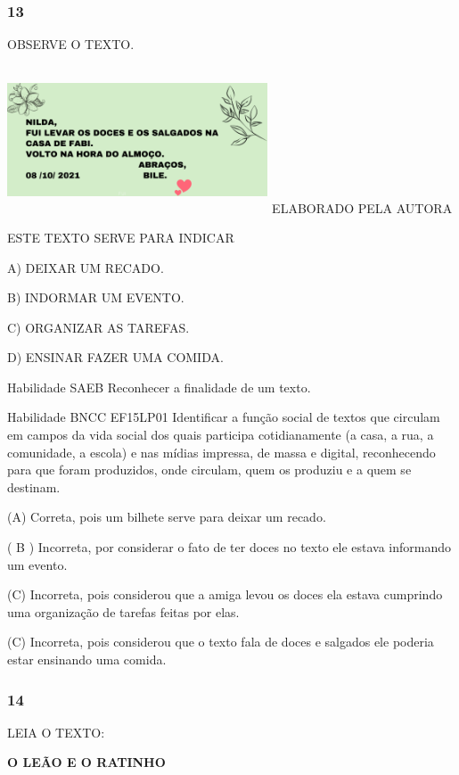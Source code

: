 \begin{escola}
\subsubsection{13 }\label{section-53}

OBSERVE O TEXTO.

\includegraphics[width=3.04633in,height=1.71374in]{media/image220.png}
ELABORADO PELA AUTORA

ESTE TEXTO SERVE PARA INDICAR

A) DEIXAR UM RECADO.

B) INDORMAR UM EVENTO.

C) ORGANIZAR AS TAREFAS.

D) ENSINAR FAZER UMA COMIDA.

Habilidade SAEB Reconhecer a finalidade de um texto.

Habilidade BNCC EF15LP01 Identificar a função social de textos que
circulam em campos da vida social dos quais participa cotidianamente (a
casa, a rua, a comunidade, a escola) e nas mídias impressa, de massa e
digital, reconhecendo para que foram produzidos, onde circulam, quem os
produziu e a quem se destinam.

(A) Correta, pois um bilhete serve para deixar um recado.

( B ) Incorreta, por considerar o fato de ter doces no texto ele estava
informando um evento.

(C) Incorreta, pois considerou que a amiga levou os doces ela estava
cumprindo uma organização de tarefas feitas por elas.

(C) Incorreta, pois considerou que o texto fala de doces e salgados ele
poderia estar ensinando uma
comida.\protect\hypertarget{_heading=h.xdbqd2s8fd2q}{}{}

\subsubsection{14}\label{section-54}

LEIA O TEXTO:

\textbf{O LEÃO E O RATINHO}


\end{escola}

